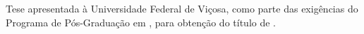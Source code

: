 
   \thispagestyle{empty}
   \setcounter{page}{0}
\begin{spacing}{1}
	\begin{center}
		\vspace*{-0.5cm}
		{\MakeUppercase{\nome} \\ }
		
		
		\vspace*{8cm}
		{\MakeUppercase{\textbf{\titulo}} \\ }
	\end{center}
	\vspace*{4cm}
	\singlespacing
	\begin{flushright}
		\begin{minipage}{7.5cm}
			{Tese apresentada à Universidade Federal de Viçosa, como parte
				das exigências do Programa de Pós-Graduação em \programa, para
				obtenção do título de \textit{\titulop}.}
		\end{minipage}
	\end{flushright}
	\vfill
	
	\begin{center}
	\MakeUppercase{\cidade}
	
	\MakeUppercase{\estado}
	
	\MakeUppercase{\ano}
	
	
	\end{center}
	
\end{spacing}